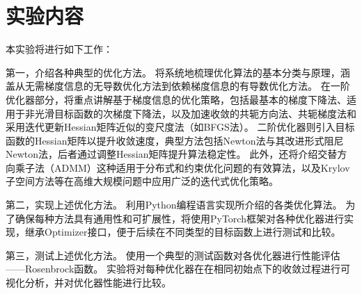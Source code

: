 \section{实验内容}

本实验将进行如下工作：

第一，介绍各种典型的优化方法。
将系统地梳理优化算法的基本分类与原理，涵盖从无需梯度信息的无导数优化方法到依赖梯度信息的有导数优化方法。
在一阶优化器部分，将重点讲解基于梯度信息的优化策略，包括最基本的梯度下降法、适用于非光滑目标函数的次梯度下降法，以及加速收敛的共轭方向法、共轭梯度法和采用迭代更新Hessian矩阵近似的变尺度法（如BFGS法）。
二阶优化器则引入目标函数的Hessian矩阵以提升收敛速度，典型方法包括Newton法与其改进形式阻尼Newton法，后者通过调整Hessian矩阵提升算法稳定性。
此外，还将介绍交替方向乘子法（ADMM）这种适用于分布式和约束优化问题的有效算法，以及Krylov子空间方法等在高维大规模问题中应用广泛的迭代式优化策略。

第二，实现上述优化方法。
利用Python编程语言实现所介绍的各类优化算法。
为了确保每种方法具有通用性和可扩展性，将使用PyTorch框架对各种优化器进行实现，继承Optimizer接口，便于后续在不同类型的目标函数上进行测试和比较。

第三，测试上述优化方法。
使用一个典型的测试函数对各优化器进行性能评估——Rosenbrock函数。
实验将对每种优化器在在相同初始点下的收敛过程进行可视化分析，并对优化器性能进行比较。
